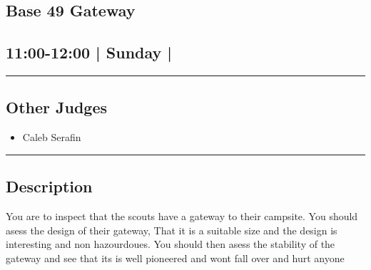 \documentclass[10pt, A5]{article}
\begin{document}
		\begin{framed}
			\begin{minipage}{\textwidth}

			\setcounter{section}{106}
							\section{\faStar \: Base 49 \faStar \: Gateway}
						
			\subsection*{11:00-12:00 | Sunday | }

			\vspace{0.25cm}
			\hrule
			\vspace{0.25cm}


			\subsection*{Other Judges}
							

				\begin{multicols}{2}

			\begin{itemize}
											\item Caleb Serafin
								\end{itemize}

			\vfill\null
			\columnbreak

			\begin{itemize}
								\end{itemize}

			\vfill\null

			\end{multicols}

			\vspace{0.25cm}
			\hrule
			\vspace{0.25cm}

			\begin{minipage}{\textwidth}
			\subsection*{\faListAlt \: Description}
			You are to inspect that the scouts have a gateway to their campsite. You should asess the design of their gateway, That it is a suitable size and the design is interesting and non hazourdoues. You should then asess the stability of the gateway and see that its is well pioneered and wont fall over and hurt anyone
			\end{minipage}


	\end{minipage}
	\end{framed}
\end{document}
